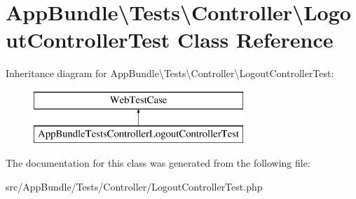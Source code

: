 \hypertarget{class_app_bundle_1_1_tests_1_1_controller_1_1_logout_controller_test}{}\section{App\+Bundle\textbackslash{}Tests\textbackslash{}Controller\textbackslash{}Logout\+Controller\+Test Class Reference}
\label{class_app_bundle_1_1_tests_1_1_controller_1_1_logout_controller_test}
Inheritance diagram for App\+Bundle\textbackslash{}Tests\textbackslash{}Controller\textbackslash{}Logout\+Controller\+Test\+:\begin{figure}[H]
\begin{center}
\leavevmode
\includegraphics[height=2.000000cm]{class_app_bundle_1_1_tests_1_1_controller_1_1_logout_controller_test}
\end{center}
\end{figure}


The documentation for this class was generated from the following file\+:\begin{DoxyCompactItemize}
\item 
src/\+App\+Bundle/\+Tests/\+Controller/Logout\+Controller\+Test.\+php\end{DoxyCompactItemize}
